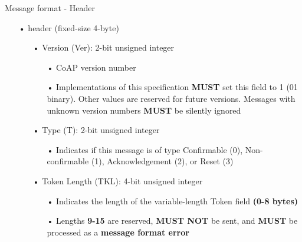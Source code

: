 \documentclass[11pt]{beamer}
\begin{document}
\begin{frame}{Message format - Header}
\begin{itemize}
\item[•] header (fixed-size 4-byte)
\begin{itemize}
\item[•] Version (Ver):  2-bit unsigned integer
\begin{itemize}
\item[•] CoAP version number
\item[•] Implementations of this specification \textbf{MUST} set this field to 1 (01 binary).  Other values are reserved for future versions. Messages with unknown version numbers \textbf{MUST} be silently ignored
\end{itemize}
\item[•] Type (T):  2-bit unsigned integer
\begin{itemize}
\item[•] Indicates if this message is of type Confirmable (0), Non-confirmable (1), Acknowledgement (2), or Reset (3)
\end{itemize}
\item[•] Token Length (TKL):  4-bit unsigned integer
\begin{itemize}
\item[•] Indicates the length of the variable-length Token field \textbf{(0-8 bytes)}
\item[•] Lengths \textbf{9-15} are reserved, \textbf{MUST NOT} be sent, and \textbf{MUST} be processed as a \textbf{message format error}
\end{itemize}
\end{itemize}
\end{itemize}
\end{frame}
\end{document}
